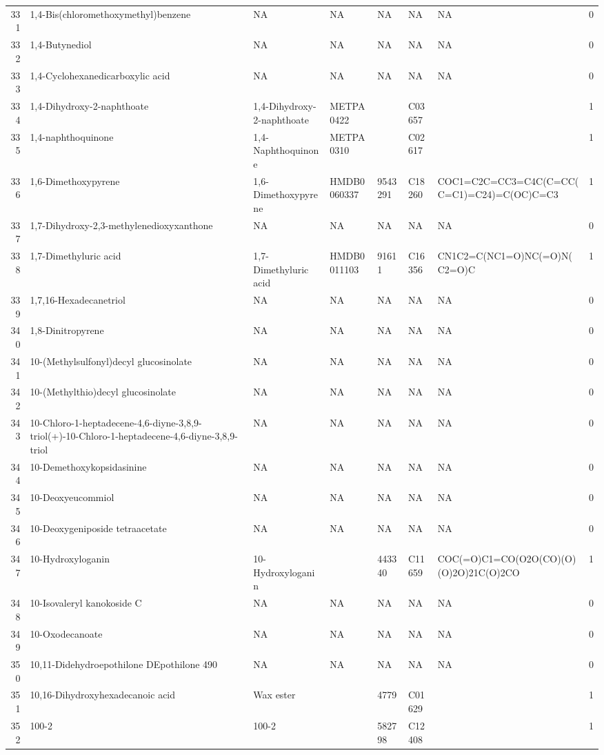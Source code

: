 \documentclass[a4paper]{article}
\begin{document}
\begin{longtable}{rlllllll}
  331 & 1,4-Bis(chloromethoxymethyl)benzene & NA & NA & NA & NA & NA & 0 \\ 
  332 & 1,4-Butynediol & NA & NA & NA & NA & NA & 0 \\ 
  333 & 1,4-Cyclohexanedicarboxylic acid & NA & NA & NA & NA & NA & 0 \\ 
  334 & 1,4-Dihydroxy-2-naphthoate & 1,4-Dihydroxy-2-naphthoate & METPA0422 &  & C03657 &  & 1 \\ 
  335 & 1,4-naphthoquinone & 1,4-Naphthoquinone & METPA0310 &  & C02617 &  & 1 \\ 
  336 & 1,6-Dimethoxypyrene & 1,6-Dimethoxypyrene & HMDB0060337 & 9543291 & C18260 & COC1=C2C=CC3=C4C(C=CC(C=C1)=C24)=C(OC)C=C3 & 1 \\ 
  337 & 1,7-Dihydroxy-2,3-methylenedioxyxanthone & NA & NA & NA & NA & NA & 0 \\ 
  338 & 1,7-Dimethyluric acid & 1,7-Dimethyluric acid & HMDB0011103 & 91611 & C16356 & CN1C2=C(NC1=O)NC(=O)N(C2=O)C & 1 \\ 
  339 & 1,7,16-Hexadecanetriol & NA & NA & NA & NA & NA & 0 \\ 
  340 & 1,8-Dinitropyrene & NA & NA & NA & NA & NA & 0 \\ 
  341 & 10-(Methylsulfonyl)decyl glucosinolate & NA & NA & NA & NA & NA & 0 \\ 
  342 & 10-(Methylthio)decyl glucosinolate & NA & NA & NA & NA & NA & 0 \\ 
  343 & 10-Chloro-1-heptadecene-4,6-diyne-3,8,9-triol(+)-10-Chloro-1-heptadecene-4,6-diyne-3,8,9-triol & NA & NA & NA & NA & NA & 0 \\ 
  344 & 10-Demethoxykopsidasinine & NA & NA & NA & NA & NA & 0 \\ 
  345 & 10-Deoxyeucommiol & NA & NA & NA & NA & NA & 0 \\ 
  346 & 10-Deoxygeniposide tetraacetate & NA & NA & NA & NA & NA & 0 \\ 
  347 & 10-Hydroxyloganin & 10-Hydroxyloganin &  & 443340 & C11659 & COC(=O)C1=CO(O2O(CO)(O)(O)2O)21C(O)2CO & 1 \\ 
  348 & 10-Isovaleryl kanokoside C & NA & NA & NA & NA & NA & 0 \\ 
  349 & 10-Oxodecanoate & NA & NA & NA & NA & NA & 0 \\ 
  350 & 10,11-Didehydroepothilone DEpothilone 490 & NA & NA & NA & NA & NA & 0 \\ 
  351 & 10,16-Dihydroxyhexadecanoic acid & Wax ester &  & 4779 & C01629 &  & 1 \\ 
  352 & 100-2 & 100-2 &  & 582798 & C12408 &  & 1 \\ 

\end{longtable}
\end{document}
